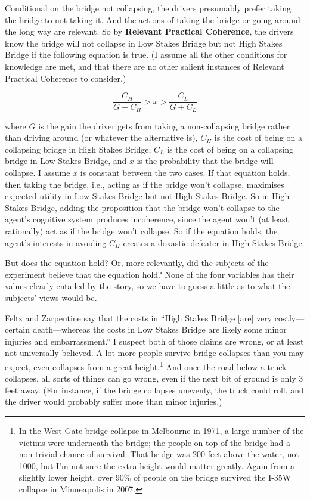 \documentclass[oneside]{book}
\begin{document}
Conditional on the bridge not collapsing, the drivers presumably prefer taking the bridge to not taking it. And the actions of taking the bridge or going around the long way are relevant. So by \textbf{Relevant Practical Coherence}, the drivers know the bridge will not collapse in Low Stakes Bridge but not High Stakes Bridge  if the following equation is true. (I assume all the other conditions for knowledge are met, and that there are no other salient instances of Relevant Practical Coherence to consider.)

\begin{equation*}
\frac{C_H}{G + C_H} > x > \frac{C_L}{G + C_L}
\end{equation*}

\noindent where $G$ is the gain the driver gets from taking a non-collapsing bridge rather than driving around (or whatever the alternative is), $C_H$ is the cost of being on a collapsing bridge in High Stakes Bridge, $C_L$ is the cost of being on a collapsing bridge in Low Stakes Bridge, and $x$ is the probability that the bridge will collapse. I assume $x$ is constant between the two cases. If that equation holds, then taking the bridge, i.e., acting as if the bridge won't collapse, maximises expected utility in Low Stakes Bridge but not High Stakes Bridge. So in High Stakes Bridge, adding the proposition that the bridge won't collapse to the agent's cognitive system produces incoherence, since the agent won't (at least rationally) act as if the bridge won't collapse. So if the equation holds, the agent's interests in avoiding $C_H$ creates a doxastic defeater in High Stakes Bridge.

But does the equation hold? Or, more relevantly, did the subjects of the experiment believe that the equation hold? None of the four variables has their values clearly entailed by the story, so we have to guess a little as to what the subjects' views would be. 

Feltz and Zarpentine say that the costs in ``High Stakes Bridge [are] very costly---certain death---whereas the costs in Low Stakes Bridge are likely some minor injuries and embarrassment.'' \cite[702]{FeltzZarpentine2010} I suspect both of those claims are wrong, or at least not universally believed. A lot more people survive bridge collapses than you may expect, even collapses from a great height.\footnote{In the West Gate bridge collapse in Melbourne in 1971, a large number of the victims were underneath the bridge; the people on top of the bridge had a non-trivial chance of survival. That bridge was 200 feet above the water, not 1000, but I'm not sure the extra height would matter greatly. Again from a slightly lower height, over 90\% of people on the bridge survived the I-35W collapse in Minneapolis in 2007.} And once the road below a truck collapses, all sorts of things can go wrong, even if the next bit of ground is only 3 feet away. (For instance, if the bridge collapses unevenly, the truck could roll, and the driver would probably suffer more than minor injuries.)
\end{document}
